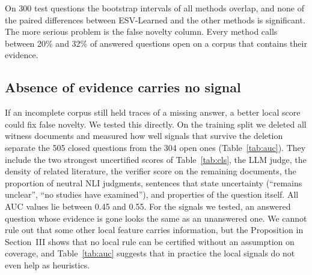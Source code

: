 \documentclass[conference,a4paper]{IEEEtran}
\theoremstyle{definition}
\begin{document}
 On 300 test questions the bootstrap intervals of all methods overlap, and none of the paired differences between ESV-Learned and the other methods is significant. The more serious problem is the false novelty column. Every method calls between 20\% and 32\% of answered questions open on a corpus that contains their evidence.

\begin{table}[t]
\centering
\caption{Uncertified gap-closure decisions on the SciFact test split (300 questions). FN: false novelty, FC: false closure, Wit.: share of quoted sentences that are gold rationales.}
\label{tab:cls}

\end{table}

\subsection{Absence of evidence carries no signal}
If an incomplete corpus still held traces of a missing answer, a better local score could fix false novelty. We tested this directly. On the training split we deleted all witness documents and measured how well signals that survive the deletion separate the 505 closed questions from the 304 open ones (Table~\ref{tab:auc}). They include the two strongest uncertified scores of Table~\ref{tab:cls}, the LLM judge, the density of related literature, the verifier score on the remaining documents, the proportion of neutral NLI judgments, sentences that state uncertainty (``remains unclear'', ``no studies have examined''), and properties of the question itself. All AUC values lie between 0.45 and 0.55. For the signals we tested, an answered question whose evidence is gone looks the same as an unanswered one. We cannot rule out that some other local feature carries information, but the Proposition in Section~III shows that no local rule can be certified without an assumption on coverage, and Table~\ref{tab:auc} suggests that in practice the local signals do not even help as heuristics.
\end{document}
